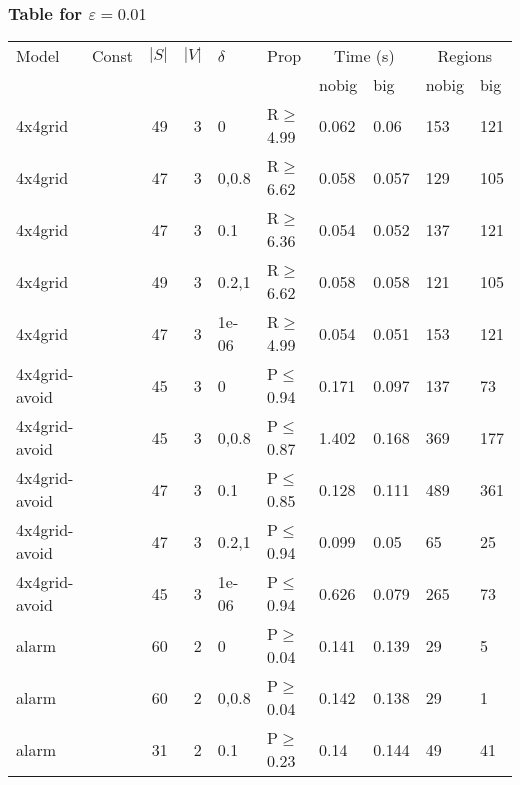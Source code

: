 \subsubsection{Table for \(\varepsilon=0.01\)}
\begin{longtable}{llrrllllll}

        \toprule
        Model & Const & $|S|$ & $|V|$ & $\delta$ & Prop & \multicolumn{2}{c}{Time (s)} & \multicolumn{2}{c}{Regions} \\
        \cmidrule(ll){7-8} \cmidrule(ll){9-10}
        & & & & & & nobig & big & nobig & big \\
        \midrule
        
 4x4grid       &          &     	49 &   3 & 0     & R$\geq$4.99  & 0.062   & 0.06    & 153     & 121    \\
 4x4grid       &          &     	47 &   3 & 0,0.8 & R$\geq$6.62  & 0.058   & 0.057   & 129     & 105    \\
 4x4grid       &          &     	47 &   3 & 0.1   & R$\geq$6.36  & 0.054   & 0.052   & 137     & 121    \\
 4x4grid       &          &     	49 &   3 & 0.2,1 & R$\geq$6.62  & 0.058   & 0.058   & 121     & 105    \\
 4x4grid       &          &     	47 &   3 & 1e-06 & R$\geq$4.99  & 0.054   & 0.051   & 153     & 121    \\
 4x4grid-avoid &          &     	45 &   3 & 0     & P$\leq$0.94  & 0.171   & 0.097   & 137     & 73     \\
 4x4grid-avoid &          &     	45 &   3 & 0,0.8 & P$\leq$0.87  & 1.402   & 0.168   & 369     & 177    \\
 4x4grid-avoid &          &     	47 &   3 & 0.1   & P$\leq$0.85  & 0.128   & 0.111   & 489     & 361    \\
 4x4grid-avoid &          &     	47 &   3 & 0.2,1 & P$\leq$0.94  & 0.099   & 0.05    & 65      & 25     \\
 4x4grid-avoid &          &     	45 &   3 & 1e-06 & P$\leq$0.94  & 0.626   & 0.079   & 265     & 73     \\
 alarm         &          &     	60 &   2 & 0     & P$\geq$0.04  & 0.141   & 0.139   & 29      & 5      \\
 alarm         &          &     	60 &   2 & 0,0.8 & P$\geq$0.04  & 0.142   & 0.138   & 29      & 1      \\
 alarm         &          &     	31 &   2 & 0.1   & P$\geq$0.23  & 0.14    & 0.144   & 49      & 41     \\

\end{longtable}
